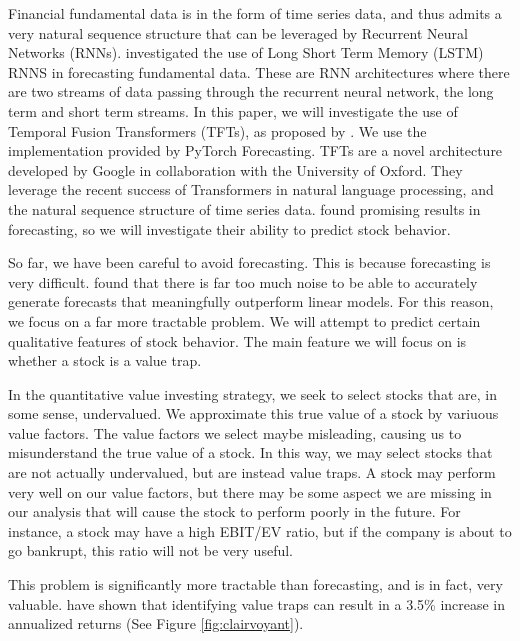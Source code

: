 \documentclass[AER]{AEA}
\begin{document}
Financial fundamental data is in the form of time series data, and thus admits a very natural sequence 
structure that can be leveraged by Recurrent Neural Networks (RNNs). \cite{euclidean} investigated the use of 
Long Short Term Memory (LSTM) RNNS in forecasting fundamental data. These are RNN architectures where there are 
two streams of data passing through the recurrent neural network, the long term and short term streams. In this 
paper, we will investigate the use of Temporal Fusion Transformers (TFTs), as proposed by \cite{tft}. We use 
the implementation provided by PyTorch Forecasting. TFTs are a novel architecture developed by Google in collaboration with the University of Oxford. 
They leverage the recent success of Transformers in natural language processing, and the natural sequence
structure of time series data. \cite{tft} found promising results in forecasting, so we will investigate their
ability to predict stock behavior.

So far, we have been careful to avoid forecasting. This is because forecasting is very difficult. 
\cite{euclidean} found that there is far too much noise to be able to accurately generate forecasts that meaningfully 
outperform linear models. For this reason, we focus on a far more tractable problem. We will attempt to predict
certain qualitative features of stock behavior. The main feature we will focus on is whether a stock is a value trap.

In the quantitative value investing strategy, we seek to select stocks that are, in some sense, undervalued.
We approximate this true value of a stock by variuous value factors. 
The value factors we select maybe misleading, causing us to misunderstand the true value of a stock.
In this way, we may select stocks that are not actually undervalued, but are instead value traps.
A stock may perform very well on our value factors, but there may be some aspect we are missing in our analysis
that will cause the stock to perform poorly in the future. For instance, a stock may have a high EBIT/EV ratio,
but if the company is about to go bankrupt, this ratio will not be very useful. 

This problem is significantly more tractable than forecasting, and is in fact, very valuable. \cite{euclidean}
have shown that identifying value traps can result in a 3.5\% increase in annualized returns (See Figure \ref{fig:clairvoyant}).
\end{document}
